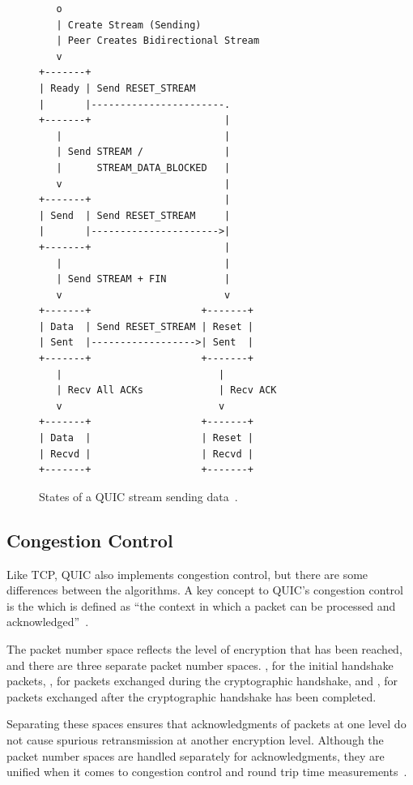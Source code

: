 \begin{figure}[htbp]
    \centering
    \begin{BVerbatim}
   o
   | Create Stream (Sending)
   | Peer Creates Bidirectional Stream
   v
+-------+
| Ready | Send RESET_STREAM
|       |-----------------------.
+-------+                       |
   |                            |
   | Send STREAM /              |
   |      STREAM_DATA_BLOCKED   |
   v                            |
+-------+                       |
| Send  | Send RESET_STREAM     |
|       |---------------------->|
+-------+                       |
   |                            |
   | Send STREAM + FIN          |
   v                            v
+-------+                   +-------+
| Data  | Send RESET_STREAM | Reset |
| Sent  |------------------>| Sent  |
+-------+                   +-------+
   |                           |
   | Recv All ACKs             | Recv ACK
   v                           v
+-------+                   +-------+
| Data  |                   | Reset |
| Recvd |                   | Recvd |
+-------+                   +-------+
    \end{BVerbatim}
    \caption[QUIC stream state machine]{States of a QUIC stream sending data~\cite{rfc9000}.}
    \label{fig:stream_states}
\end{figure}

\subsection{Congestion Control}
Like TCP, QUIC also implements congestion control, but there are
some differences between the algorithms. A key concept
to QUIC's congestion control is the  which
is defined as \enquote{the context in which a packet can be processed
and acknowledged}~\cite{rfc9000}. 

The packet number space reflects the level of encryption that has been reached, and there 
are three separate packet number spaces. ,
for the initial handshake packets, , for packets
exchanged during the cryptographic handshake, and , for packets exchanged after the cryptographic handshake
has been completed.

Separating these spaces ensures that acknowledgments of packets at one level do not cause
spurious retransmission at another encryption level.
Although the packet number spaces are handled
separately for acknowledgments, they are
unified when it comes to congestion control and round trip
time measurements~\cite[sec.~4.1]{rfc9002}.

